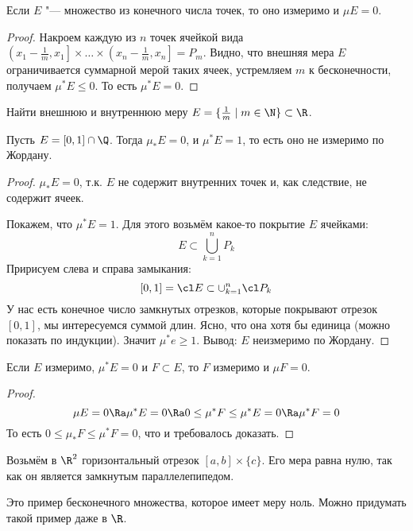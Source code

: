 \begin{exmp}
	Если $E$ "--- множество из конечного числа точек, то оно измеримо и $\mu E = 0$.
\end{exmp}
\begin{proof}
	Накроем каждую из $n$ точек ячейкой вида $\left(x_1 - \frac 1m, x_1\right] \times\dots\times \left(x_n - \frac 1m, x_n\right] = P_m$.
	Видно, что внешняя мера $E$ ограничивается суммарной мерой таких ячеек, устремляем $m$ к бесконечности, получаем $\mu^* E \le 0$.
	То есть $\mu^* E = 0$.
\end{proof}

\begin{Exercise}
	Найти внешнюю и внутреннюю меру $E = \{ \frac 1 m \mid m \in \N \} \subset \R$.
\end{Exercise}

\begin{exmp}
	Пусть $E = [0, 1] \cap \Q$.
	Тогда $\mu_* E = 0$, и $\mu^* E = 1$, то есть оно не измеримо по Жордану.
\end{exmp}
\begin{proof}
	$\mu_* E = 0$, т.к. $E$ не содержит внутренних точек и, как следствие, не содержит ячеек.

	Покажем, что $\mu^* E = 1$.
	Для этого возьмём какое-то покрытие $E$ ячейками:
	\[ E \subset \bigcup_{k=1}^n P_k \]
	Пририсуем слева и справа замыкания:
	\[ [0,1] = \cl E \subset \cup_{k=1}^n \cl P_k \]
	У нас есть конечное число замкнутых отрезков, которые покрывают отрезок $[0,1]$, мы интересуемся
	суммой длин.
	Ясно, что она хотя бы единица (можно показать по индукции).
	Значит $\mu^*e \ge 1$.
	Вывод: $E$ неизмеримо по Жордану.
\end{proof}

\begin{exmp}
	Если $E$ измеримо, $\mu^* E = 0$ и $F \subset E$, то $F$ измеримо и $\mu F = 0$.
\end{exmp}
\begin{proof}
	\[ \mu E = 0 \Ra \mu^* E = 0 \Ra 0 \le \mu^* F \le \mu^* E = 0 \Ra \mu^*F = 0 \]
	То есть $0 \le \mu_* F \le \mu^* F = 0$, что и требовалось доказать.
\end{proof}

\begin{exmp}
	Возьмём в $\R^2$ горизонтальный отрезок $[a,b] \times \{c\}$.
	Его мера равна нулю, так как он является замкнутым параллелепипедом.
\end{exmp}
\begin{Rem}
	Это пример бесконечного множества, которое имеет меру ноль.
	Можно придумать такой пример даже в $\R$.
\end{Rem}

